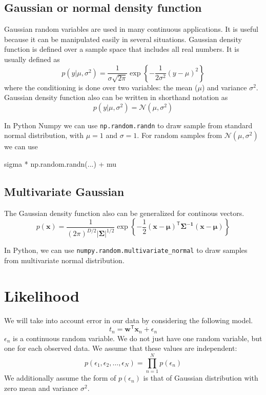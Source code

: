 \documentclass[a4paper,11pt]{article} %
\newcommand{\txtinline}[1]{\texttt{#1}}
\newcommand{\pyinline}[1]{\texttt{#1}}
\begin{document}
\subsection{Gaussian or normal density function}

Gaussian random variables are used in many continuous applications. It is useful
because it can be manipulated easily in several situations. Gaussian density function
is defined over a sample space that includes all real numbers. It is usually defined as
\begin{equation}
p(y|\mu,\sigma^2) = \frac{1}{\sigma\sqrt{2\pi}}\exp\left\{
-\frac{1}{2\sigma^2}(y - \mu)^2
\right\}
\end{equation}
where the conditioning is done over two variables: the mean ($\mu$) and variance $\sigma^2$.
Gaussian density function also can be written in shorthand notation as
\begin{equation}
p(y|\mu,\sigma^2) = \mathcal{N}(\mu, \sigma^2)
\end{equation}

In Python Numpy we can use \txtinline{np.random.randn}
to draw sample from standard normal distribution, with $\mu=1$
and $\sigma=1$.
For random samples from $\mathcal{N}(\mu, \sigma^2)$ we can use
\begin{pythoncode}
sigma * np.random.randn(...) + mu
\end{pythoncode}


\subsection{Multivariate Gaussian}

The Gaussian density function also can be generalized for continous vectors.
\begin{equation}
p(\mathbf{x}) = \frac{1}{(2\pi)^{D/2}|\boldsymbol{\Sigma}|^{1/2}}
\exp\left\{-\frac{1}{2}(\mathbf{x}-\boldsymbol{\mu})^{\mathsf{T}}
\boldsymbol{\Sigma^{-1}}
(\mathbf{x}-\boldsymbol{\mu})
\right\}
\end{equation}

In Python, we can use \pyinline{numpy.random.multivariate_normal}
to draw samples from multivariate normal distribution.


\section{Likelihood}
We will take into account error in our data by considering the following model.
\begin{equation}
t_{n} = \mathbf{w}^{\mathsf{T}}\mathbf{x}_{n} + \epsilon_{n}
\end{equation}
$\epsilon_{n}$ is a continuous random variable.
We do not just have one random variable, but one for each observed data.
We assume that these values are independent:
\begin{equation}
p(\epsilon_{1},\epsilon_{2},\ldots,\epsilon_{N}) = \prod_{n=1}^{N} p(\epsilon_{n})
\end{equation}
We additionally assume the form of $p(\epsilon_{n})$ is that of Gaussian
distribution with zero mean and variance $\sigma^2$.
\end{document}
